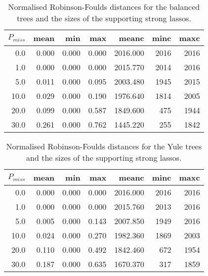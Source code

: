 \begin{table}
  \centering
  \begin{tabular}{rrrrrrr}
    \toprule
    $P_{miss}$ & mean  &    min   &   max  &   meanc &    minc &   maxc\\
    \midrule
    0.0 &   0.000  &  0.000   & 0.000  & 2016.000   &  2016  &   2016\\
    1.0  &  0.000  &  0.000   & 0.000  & 2015.770   &  2014  &   2016\\
    5.0  &  0.011  &  0.000   & 0.095  & 2003.480   &  1945  &   2015\\
    10.0 &   0.029 &   0.000  &  0.190 & 1976.640  &   1814 &    2005\\
    20.0 &   0.099 &  0.000   & 0.587  & 1849.600   &   475  &   1944\\
    30.0 &   0.261 &   0.000  &  0.762 & 1445.220  &    255 &    1842\\
    \bottomrule
  \end{tabular}
  \caption{Normalised Robinson-Foulds distances for the
    balanced trees and the sizes of the supporting strong lassos.}
  \label{tab:balanced}
\end{table}

\begin{table}
  \centering
  \begin{tabular}{rrrrrrr}
    \toprule
    $P_{miss}$ &  mean  &    min &     max &    meanc &    minc &   maxc\\
    \midrule
    0.0 &   0.000  &  0.000 &   0.000 & 2016.000  &   2016  &   2016\\
    1.0 &   0.000  &  0.000 &   0.000 & 2015.760  &   2013  &   2016\\
    5.0 &   0.005  &  0.000 &   0.143 & 2007.850  &   1949  &   2016\\
    10.0&    0.024 &   0.000 &   0.270 & 1982.360 &  1869 &   2003\\
    20.0 &   0.110 &   0.000 &   0.492 & 1842.460 &    672 &   1954\\
    30.0 &   0.187 &   0.000 &   0.635 & 1670.370 &    317 &   1859\\
    \bottomrule
  \end{tabular}
  \caption{Normalised Robinson-Foulds distances for the
    Yule trees and the sizes of the supporting strong lassos.}
  \label{tab:yule}
\end{table}

